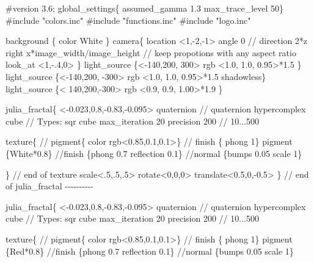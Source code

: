 \documentclass[
  11pt,
]{krantz}
\newenvironment{Shaded}{\begin{snugshade}}{\end{snugshade}}
\newcommand{\NormalTok}[1]{#1}
\theoremstyle{definition}
\theoremstyle{definition}
\theoremstyle{definition}
\theoremstyle{definition}
\theoremstyle{remark}
\begin{document}
\begin{Shaded}
\begin{Highlighting}[]
\NormalTok{\#version 3.6;}
\NormalTok{global\_settings\{ assumed\_gamma 1.3 max\_trace\_level 50\}}
\NormalTok{\#include "colors.inc"}
\NormalTok{\#include "functions.inc"}
\NormalTok{\#include "logo.inc"}

\NormalTok{background \{ color White \}}
\NormalTok{camera\{ location  \textless{}1,{-}2,{-}1\textgreater{}  }
\NormalTok{        angle 0 // direction 2*z}
\NormalTok{        right    x*image\_width/image\_height}
\NormalTok{        // keep propotions with any aspect ratio}
\NormalTok{        look\_at   \textless{}1,{-}.4,0\textgreater{}}
\NormalTok{      \}}
\NormalTok{light\_source \{\textless{}{-}140,200, 300\textgreater{}}
\NormalTok{   rgb \textless{}1.0, 1.0, 0.95\textgreater{}*1.5 \}}
\NormalTok{light\_source \{\textless{}{-}140,200, {-}300\textgreater{}}
\NormalTok{   rgb \textless{}1.0, 1.0, 0.95\textgreater{}*1.5 shadowless\}}
\NormalTok{light\_source \{\textless{} 140,200,{-}300\textgreater{}}
\NormalTok{   rgb \textless{}0.9, 0.9, 1.00\textgreater{}*1.9 \}}

\NormalTok{julia\_fractal\{ \textless{}{-}0.023,0.8,{-}0.83,{-}0.095\textgreater{}}
\NormalTok{   quaternion // quaternion hypercomplex}
\NormalTok{   cube             // Types: sqr  cube}
\NormalTok{   max\_iteration 20}
\NormalTok{   precision 200     // 10...500}

\NormalTok{   texture\{}
\NormalTok{  //   pigment\{ color rgb\textless{}0.85,0.1,0.1\textgreater{}\}}
\NormalTok{    // finish \{ phong 1\}}
\NormalTok{     pigment \{White*0.8\}}
\NormalTok{     //finish \{phong 0.7 reflection 0.1\}}
\NormalTok{     //normal \{bumps 0.05 scale 1\}}

\NormalTok{   \} // end of texture}
\NormalTok{   scale\textless{}.5,.5,.5\textgreater{}}
\NormalTok{   rotate\textless{}0,0,0\textgreater{}}
\NormalTok{   translate\textless{}0.5,0,{-}0.5\textgreater{}}
\NormalTok{\} // end of julia\_fractal {-}{-}{-}{-}{-}{-}{-}{-}{-}{-}}

\NormalTok{    julia\_fractal\{ \textless{}{-}0.023,0.8,{-}0.83,{-}0.095\textgreater{}}
\NormalTok{   quaternion // quaternion hypercomplex}
\NormalTok{   cube             // Types: sqr  cube}
\NormalTok{   max\_iteration 20}
\NormalTok{   precision 200     // 10...500}

\NormalTok{   texture\{}
\NormalTok{  //   pigment\{ color rgb\textless{}0.85,0.1,0.1\textgreater{}\}}
\NormalTok{    // finish \{ phong 1\}}
\NormalTok{     pigment \{Red*0.8\}}
\NormalTok{     //finish \{phong 0.7 reflection 0.1\}}
\NormalTok{     //normal \{bumps 0.05 scale 1\}}


\end{Highlighting}
\end{Shaded}
\end{document}
